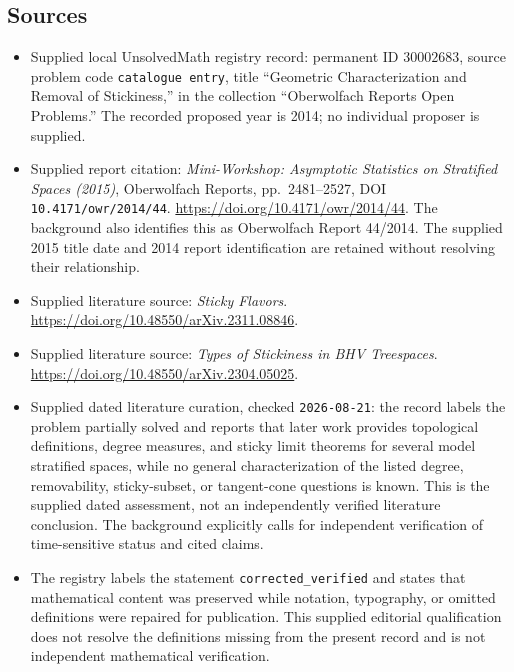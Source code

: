 \documentclass[11pt]{article}
\begin{document}
\subsection{Sources}
\begin{itemize}
\item Supplied local UnsolvedMath registry record: permanent ID \(30002683\), source problem code \texttt{catalogue entry}, title ``Geometric Characterization and Removal of Stickiness,'' in the collection ``Oberwolfach Reports Open Problems.'' The recorded proposed year is 2014; no individual proposer is supplied.
\item Supplied report citation: \emph{Mini-Workshop: Asymptotic Statistics on Stratified Spaces (2015)}, Oberwolfach Reports, pp.\ 2481--2527, DOI \texttt{10.4171/owr/2014/44}. \url{https://doi.org/10.4171/owr/2014/44}. The background also identifies this as Oberwolfach Report 44/2014. The supplied 2015 title date and 2014 report identification are retained without resolving their relationship.
\item Supplied literature source: \emph{Sticky Flavors}. \url{https://doi.org/10.48550/arXiv.2311.08846}.
\item Supplied literature source: \emph{Types of Stickiness in BHV Treespaces}. \url{https://doi.org/10.48550/arXiv.2304.05025}.
\item Supplied dated literature curation, checked \texttt{2026-08-21}: the record labels the problem partially solved and reports that later work provides topological definitions, degree measures, and sticky limit theorems for several model stratified spaces, while no general characterization of the listed degree, removability, sticky-subset, or tangent-cone questions is known. This is the supplied dated assessment, not an independently verified literature conclusion. The background explicitly calls for independent verification of time-sensitive status and cited claims.
\item The registry labels the statement \texttt{corrected\_verified} and states that mathematical content was preserved while notation, typography, or omitted definitions were repaired for publication. This supplied editorial qualification does not resolve the definitions missing from the present record and is not independent mathematical verification.
\end{itemize}
\end{document}
